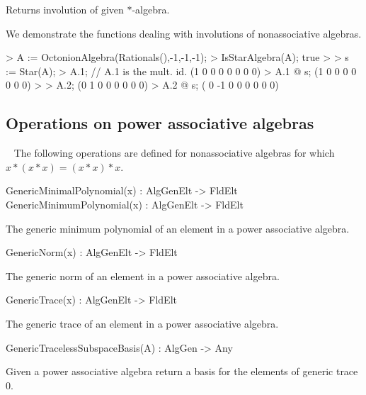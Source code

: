 \documentclass{documentation}
\begin{document}
Returns involution of given $*$-algebra.

\begin{example}[StarAlgebra]

We demonstrate the functions dealing with involutions of nonassociative algebras.
\begin{code}
> A := OctonionAlgebra(Rationals(),-1,-1,-1);
> IsStarAlgebra(A);
true
> 
> s := Star(A);
> A.1; // A.1 is the mult. id.
(1 0 0 0 0 0 0 0)
> A.1 @ s; 
(1 0 0 0 0 0 0 0)
> 
> A.2;
(0 1 0 0 0 0 0 0)
> A.2 @ s;
( 0 -1  0  0  0  0  0  0)
\end{code}
\end{example}

\subsection{Operations on power associative algebras}~
The following operations are defined for nonassociative algebras for which $x*(x*x)=(x*x)*x$.

\begin{intrinsics}
GenericMinimalPolynomial(x) : AlgGenElt -> FldElt
GenericMinimumPolynomial(x) : AlgGenElt -> FldElt
\end{intrinsics}

The generic minimum polynomial of an element in a power associative algebra.

\begin{intrinsics}
GenericNorm(x) : AlgGenElt -> FldElt
\end{intrinsics}

The generic norm of an element in a power associative algebra.

\begin{intrinsics}
GenericTrace(x) : AlgGenElt -> FldElt
\end{intrinsics}

The generic trace of an element in a power associative algebra.

\begin{intrinsics}
GenericTracelessSubspaceBasis(A) : AlgGen -> Any
\end{intrinsics}

Given a power associative algebra return a basis for the elements of generic trace 0.
\end{document}
